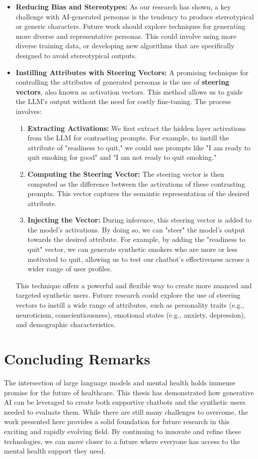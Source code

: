 \begin{itemize}
    \item \textbf{Reducing Bias and Stereotypes:} As our research has shown, a key challenge with AI-generated personas is the tendency to produce stereotypical or generic characters. Future work should explore techniques for generating more diverse and representative personas. This could involve using more diverse training data, or developing new algorithms that are specifically designed to avoid stereotypical outputs.
    \item \textbf{Instilling Attributes with Steering Vectors:} A promising technique for controlling the attributes of generated personas is the use of \textbf{steering vectors}, also known as activation vectors. This method allows us to guide the LLM's output without the need for costly fine-tuning. The process involves:
    \begin{enumerate}
        \item \textbf{Extracting Activations:} We first extract the hidden layer activations from the LLM for contrasting prompts. For example, to instill the attribute of "readiness to quit," we could use prompts like "I am ready to quit smoking for good" and "I am not ready to quit smoking."
        \item \textbf{Computing the Steering Vector:} The steering vector is then computed as the difference between the activations of these contrasting prompts. This vector captures the semantic representation of the desired attribute.
        \item \textbf{Injecting the Vector:} During inference, this steering vector is added to the model's activations. By doing so, we can "steer" the model's output towards the desired attribute. For example, by adding the "readiness to quit" vector, we can generate synthetic smokers who are more or less motivated to quit, allowing us to test our chatbot's effectiveness across a wider range of user profiles.
    \end{enumerate}
    This technique offers a powerful and flexible way to create more nuanced and targeted synthetic users. Future research could explore the use of steering vectors to instill a wide range of attributes, such as personality traits (e.g., neuroticism, conscientiousness), emotional states (e.g., anxiety, depression), and demographic characteristics.
\end{itemize}

\section{Concluding Remarks}

The intersection of large language models and mental health holds immense promise for the future of healthcare. This thesis has demonstrated how generative AI can be leveraged to create both supportive chatbots and the synthetic users needed to evaluate them. While there are still many challenges to overcome, the work presented here provides a solid foundation for future research in this exciting and rapidly evolving field. By continuing to innovate and refine these technologies, we can move closer to a future where everyone has access to the mental health support they need.
